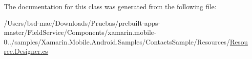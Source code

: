 The documentation for this class was generated from the following file\+:\begin{DoxyCompactItemize}
\item 
/\+Users/bsd-\/mac/\+Downloads/\+Pruebas/prebuilt-\/apps-\/master/\+Field\+Service/\+Components/xamarin.\+mobile-\/0../samples/\+Xamarin.\+Mobile.\+Android.\+Samples/\+Contacts\+Sample/\+Resources/\hyperlink{_components_2xamarin_8mobile-0_86_81_2samples_2_xamarin_8_mobile_8_android_8_samples_2_contacts_d56de22a85d1f6d80155675d1a06eae3}{Resource.\+Designer.\+cs}\end{DoxyCompactItemize}
